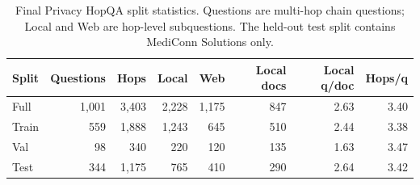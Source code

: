 \begin{table}[t]
\centering
\small
\begin{tabular}{lrrrrrrr}
\toprule
\textbf{Split} & \textbf{Questions} & \textbf{Hops} & \textbf{Local} & \textbf{Web} & \textbf{Local docs} & \textbf{Local q/doc} & \textbf{Hops/q} \\
\midrule
Full & 1,001 & 3,403 & 2,228 & 1,175 & 847 & 2.63 & 3.40 \\
Train & 559 & 1,888 & 1,243 & 645 & 510 & 2.44 & 3.38 \\
Val & 98 & 340 & 220 & 120 & 135 & 1.63 & 3.47 \\
Test & 344 & 1,175 & 765 & 410 & 290 & 2.64 & 3.42 \\
\bottomrule
\end{tabular}
\caption{Final Privacy HopQA split statistics. Questions are multi-hop chain questions; Local and Web are hop-level subquestions. The held-out test split contains MediConn Solutions only.}
\label{tab:privacy_hopqa_split_summary}
\end{table}
